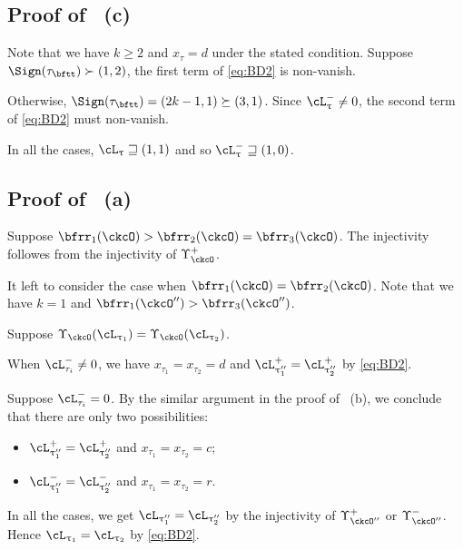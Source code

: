 \documentclass[12pt,a4paper]{amsart}
\def\pac#1{\ac_{#1}^+}
\def\nac#1{\ac_{#1}^-}
\def\ac{\cL}
\numberwithin{equation}{section}
\theoremstyle{remark}
\def\PBPes{\mathrm{PBP}^{\mathrm{ext}}_{\star}}
\begin{document}
  \subsection*{\bf Proof of ~(c)}

  Note that we have $k\geq 2$ and $x_{\tau}=d$ under the stated condition.
  Suppose $\Sign( {\tau}_{\bftt} )\succ (1,2)$, the
  first term of \eqref{eq:BD2} is non-vanish.

  Otherwise, $\Sign( \tau_{\bftt} ) = (2k-1,1)\succeq (3,1)$.
  Since $\nac{\uptau}\neq 0$, the second term of \eqref{eq:BD2} must
  non-vanish.

 In all the cases,  $\ac_{\uptau}\sqsupseteq (1,1)$ and so  $\nac{\uptau}\sqsupseteq (1,0)$.


\subsection*{\bf Proof of ~(a)}

Suppose $\bfrr_{1}(\ckcO)>\bfrr_{2}(\ckcO)=\bfrr_{3}(\ckcO)$. The injectivity
followes from the injectivity of $\Upsilon_{\ckcO}^{+}$.

It left to consider the case when $\bfrr_{1}(\ckcO)=\bfrr_{2}(\ckcO)$.
Note that we have $k=1$ and $\bfrr_{1}(\ckcO'')>\bfrr_{3}(\ckcO'')$.

Suppose $\Upsilon_{\ckcO}(\ac_{\uptau_{1}}) = \Upsilon_{\ckcO}(\ac_{\uptau_{2}})$.

When $\nac{ \tau_{i} }\neq 0$, we have $x_{\tau_{1}}=x_{\tau_{2}}=d$ and
$\pac{\uptau''_{1}} = \pac{\uptau''_{2}}$ by \eqref{eq:BD2}.

Suppose $\nac{ \tau_{i} }=0$.
By the similar argument in the proof of ~(b),
we conclude that there are only two possibilities:
\begin{itemize}
  \item $\pac{\uptau''_{1}} = \pac{\uptau''_{2}}$ and
  $x_{\tau_{1}}=x_{\tau_{2}} = c$;
  \item $\nac{\uptau''_{1}} = \nac{\uptau''_{2}}$ and
  $x_{\tau_{1}}=x_{\tau_{2}} = r$.
\end{itemize}

In all the cases,  we get $\ac_{\uptau''_{1}}=\ac_{\uptau''_{2}}$ by the
injectivity of $\Upsilon_{\ckcO''}^{+}$ or $\Upsilon_{\ckcO''}^{-}$.
Hence $\ac_{\uptau_{1}}=\ac_{\uptau_{2}}$ by \eqref{eq:BD2}.
\end{document}
